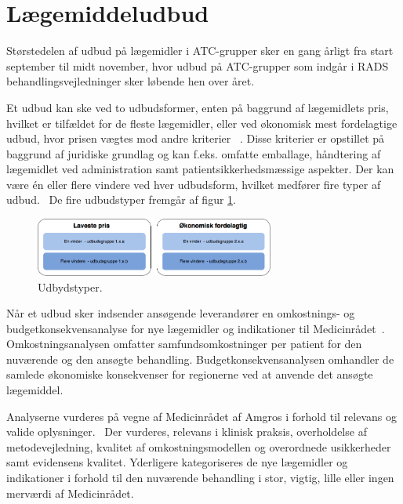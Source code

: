 \section{Lægemiddeludbud}
Størstedelen af udbud på lægemidler i ATC-grupper sker en gang årligt fra start september til midt november, hvor udbud på ATC-grupper som indgår i RADS behandlingsvejledninger  sker løbende hen over året.~\citep{Sygehusapoteket2017}

Et udbud kan ske ved to udbudsformer, enten på baggrund af lægemidlets pris, hvilket er tilfældet for de fleste lægemidler, eller ved økonomisk mest fordelagtige udbud, hvor prisen vægtes mod andre kriterier ~\citep{Amgros2018a}. Disse kriterier er opstillet på baggrund af juridiske grundlag og kan f.eks. omfatte emballage, håndtering af lægemidlet ved administration samt patientsikkerhedsmæssige aspekter. Der kan være én eller flere vindere ved hver udbudsform, hvilket medfører fire typer af udbud.~\citep{Amgros2018a} De fire udbudstyper fremgår af figur \ref{fig:TypeUdbud}.

\begin{figure}[H]\centering
	\includegraphics[width=0.7\textwidth]{billeder/TypeUdbud.png} 
	\caption{Udbydstyper.~\citep{Amgros2018a}}
	\label{fig:TypeUdbud}  
\end{figure}

Når et udbud sker indsender ansøgende leverandører en omkostnings- og budgetkonsekvensanalyse for nye lægemidler og indikationer til Medicinrådet~\citep{Amgros2017, Amgros2017a}. Omkostningsanalysen omfatter samfundsomkostninger per patient for den nuværende og den ansøgte behandling.
Budgetkonsekvensanalysen omhandler de samlede økonomiske konsekvenser for regionerne ved at anvende det ansøgte lægemiddel.~\citep{Amgros2017a}

Analyserne vurderes på vegne af Medicinrådet af Amgros i forhold til relevans og valide oplysninger.~\citep{Amgros2017, Amgros2017a} Der vurderes, relevans i klinisk praksis, overholdelse af metodevejledning, kvalitet af omkostningsmodellen og overordnede usikkerheder samt evidensens kvalitet. Yderligere kategoriseres de nye lægemidler og indikationer i forhold til den nuværende behandling i stor, vigtig, lille eller ingen merværdi af Medicinrådet.~\citep{Amgros2017, Amgros2017a}

